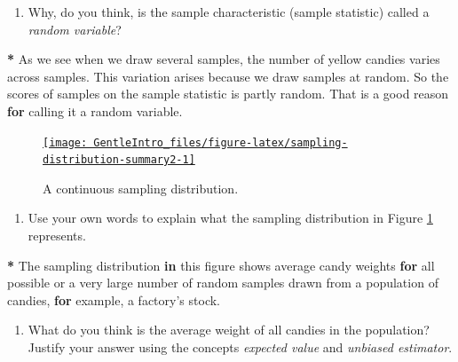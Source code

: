\documentclass[a4paper]{book}
\newenvironment{Shaded}{\begin{snugshade}}{\end{snugshade}}
\newcommand{\StringTok}[1]{\textcolor[rgb]{0.00,0.00,0.00}{#1}}
\newcommand{\ControlFlowTok}[1]{\textcolor[rgb]{0.00,0.00,0.00}{\textbf{#1}}}
\newcommand{\OperatorTok}[1]{\textcolor[rgb]{0.00,0.00,0.00}{\textbf{#1}}}
\newcommand{\NormalTok}[1]{#1}
\providecommand{\tightlist}{%
  \setlength{\itemsep}{0pt}\setlength{\parskip}{0pt}}
\theoremstyle{definition}
\theoremstyle{definition}
\theoremstyle{definition}
\theoremstyle{remark}
\begin{document}
\begin{enumerate}
\def\labelenumi{\arabic{enumi}.}
\setcounter{enumi}{5}
\tightlist
\item
  Why, do you think, is the sample characteristic (sample statistic)
  called a \emph{random variable}?
\end{enumerate}

\begin{Shaded}
\begin{Highlighting}[]
\OperatorTok{*}\StringTok{ }\NormalTok{As we see when we draw several samples, the number of yellow candies varies}
\NormalTok{across samples. This variation arises because we draw samples at random. So}
\NormalTok{the scores of samples on the sample statistic is partly random. That is a good}
\NormalTok{reason }\ControlFlowTok{for}\NormalTok{ calling it a random variable.}
\end{Highlighting}
\end{Shaded}

\begin{figure}[H]
\href{http://82.196.4.233:3838/apps/p-values/}{\texttt{[image: GentleIntro\_files/figure-latex/sampling-distribution-summary2-1]} }\caption{A continuous sampling distribution.}\label{fig:sampling-distribution-summary2}
\end{figure}

\begin{enumerate}
\def\labelenumi{\arabic{enumi}.}
\setcounter{enumi}{6}
\tightlist
\item
  Use your own words to explain what the sampling distribution in Figure
  \ref{fig:sampling-distribution-summary2} represents.
\end{enumerate}

\begin{Shaded}
\begin{Highlighting}[]
\OperatorTok{*}\StringTok{ }\NormalTok{The sampling distribution }\ControlFlowTok{in}\NormalTok{ this figure shows average candy weights }\ControlFlowTok{for}\NormalTok{ all}
\NormalTok{possible or a very large number of random samples drawn from a population of}
\NormalTok{candies, }\ControlFlowTok{for}\NormalTok{ example, a factory}\StringTok{'s stock.}
\end{Highlighting}
\end{Shaded}

\begin{enumerate}
\def\labelenumi{\arabic{enumi}.}
\setcounter{enumi}{7}
\tightlist
\item
  What do you think is the average weight of all candies in the
  population? Justify your answer using the concepts \emph{expected
  value} and \emph{unbiased estimator}.
\end{enumerate}
\end{document}
